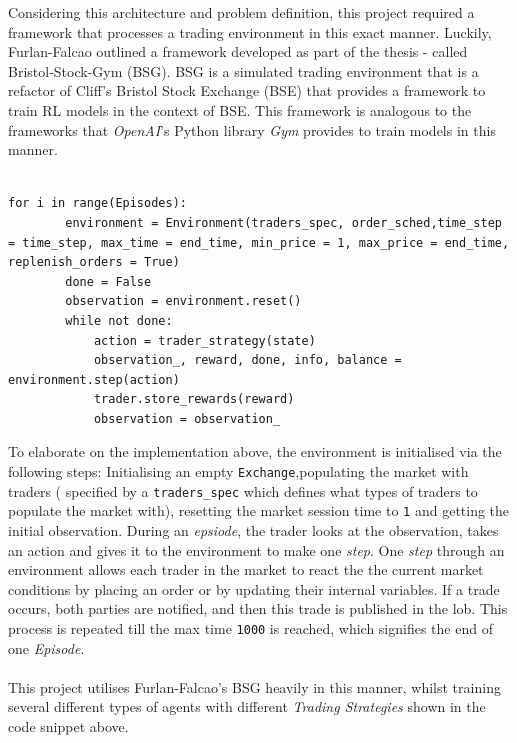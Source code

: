 \documentclass[ %
                    author={Ashwinder Khurana},
                supervisor={Prof Dave Cliff},
                    degree={MEng},
                     title={The Deeply Reinforced Trader},
                  subtitle={},
                      type={enterprise},
                      year={2020} ]{dissertation}
\begin{document}
{\noindent
Considering this architecture and problem definition, this project required a framework that processes a trading environment in this exact manner. Luckily, Furlan-Falcao outlined a framework developed as part of the thesis - called Bristol-Stock-Gym (BSG). BSG is a simulated trading environment that is a refactor of Cliff's Bristol Stock Exchange (BSE) that provides a framework to train RL models in the context of BSE. This framework is analogous to the frameworks that \textit{OpenAI}'s Python library \textit{Gym} provides to train models in this manner. 
\\
\\
\begin{lstlisting}[label=main-loop, caption = Main loop to step through trading environment]
for i in range(Episodes):
        environment = Environment(traders_spec, order_sched,time_step = time_step, max_time = end_time, min_price = 1, max_price = end_time, replenish_orders = True)
        done = False
        observation = environment.reset()
        while not done:
            action = trader_strategy(state)
            observation_, reward, done, info, balance = environment.step(action)
            trader.store_rewards(reward)
            observation = observation_
\end{lstlisting}
\noindent
To elaborate on the implementation above, the environment is initialised via the following steps:  Initialising an empty \texttt{Exchange},populating the market with traders ( specified by a \texttt{traders\_spec} which defines what types of traders to populate the market with), resetting the market session time to \texttt{1} and getting the initial observation. During an \textit{epsiode}, the trader looks at the observation, takes an action and gives it to the environment to make one \textit{step}. One \textit{step} through an environment allows each trader in the market to react the the current market conditions by placing an order or by updating their internal variables. If a trade occurs, both parties are notified, and then this trade is published in the lob. This process is repeated till the max time \texttt{1000} is reached, which signifies the end of one \textit{Episode}. 
\\
\\
\noindent
This project utilises Furlan-Falcao's BSG heavily in this manner, whilst training several different types of agents with different \textit{Trading Strategies} shown in the code snippet above.

}
\end{document}
